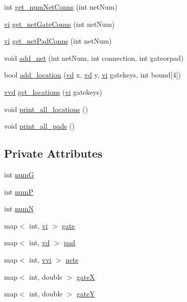 \begin{DoxyCompactItemize}
\item 
int \hyperlink{classmothercore_a3011be859dee0013e29f79abf268aadc}{get\+\_\+num\+Net\+Conns} (int net\+Num)
\item 
\hyperlink{qplacer_8cpp_a2954e26aee7d16c4a58d5cfb5571ea7e}{vi} \hyperlink{classmothercore_a6f54e96436e2451aaad73a72a19586f4}{get\+\_\+net\+Gate\+Conns} (int net\+Num)
\item 
\hyperlink{qplacer_8cpp_a2954e26aee7d16c4a58d5cfb5571ea7e}{vi} \hyperlink{classmothercore_a2259dbb05fb9c58c0ae092d695780beb}{get\+\_\+net\+Pad\+Conns} (int net\+Num)
\item 
void \hyperlink{classmothercore_a43d5c569faafb37f221a8c40252f4bb0}{add\+\_\+net} (int net\+Num, int connection, int gateorpad)
\item 
bool \hyperlink{classmothercore_a850753340ba6043464b7a93d6bf58124}{add\+\_\+location} (\hyperlink{qplacer_8cpp_a2f3b3a0095b65103cd56cf292e85fb85}{vd} x, \hyperlink{qplacer_8cpp_a2f3b3a0095b65103cd56cf292e85fb85}{vd} y, \hyperlink{qplacer_8cpp_a2954e26aee7d16c4a58d5cfb5571ea7e}{vi} gatekeys, int bound\mbox{[}4\mbox{]})
\item 
\hyperlink{qplacer_8cpp_a81afaa7cd3e8a4f1f3ff6300860a04f0}{vvd} \hyperlink{classmothercore_a7fa5a52e1a1790cd926fad59214c86c3}{get\+\_\+locations} (\hyperlink{qplacer_8cpp_a2954e26aee7d16c4a58d5cfb5571ea7e}{vi} gatekeys)
\item 
void \hyperlink{classmothercore_a2b0d43404024b9e7cc1486197784464b}{print\+\_\+all\+\_\+locations} ()
\item 
void \hyperlink{classmothercore_a275771097e3bcdd9bb9ae0f81deec259}{print\+\_\+all\+\_\+pads} ()
\end{DoxyCompactItemize}
\subsection*{Private Attributes}
\begin{DoxyCompactItemize}
\item 
int \hyperlink{classmothercore_ae81a713046775c9beb1e865f54238d58}{numG}
\item 
int \hyperlink{classmothercore_a2267ccb4d62638cb401e86b612a7b88a}{numP}
\item 
int \hyperlink{classmothercore_a06dd4fcec53dffd503474103e59fd2ed}{numN}
\item 
map$<$ int, \hyperlink{qplacer_8cpp_a2954e26aee7d16c4a58d5cfb5571ea7e}{vi} $>$ \hyperlink{classmothercore_a6d876a7f308f91dedcfeffab73b6d7e1}{gate}
\item 
map$<$ int, \hyperlink{qplacer_8cpp_a2f3b3a0095b65103cd56cf292e85fb85}{vd} $>$ \hyperlink{classmothercore_aa99289e91a4a78b1edc271498a68f88b}{pad}
\item 
map$<$ int, \hyperlink{qplacer_8cpp_accbf8abb54b0735d3ff50f4df4f45cb2}{vvi} $>$ \hyperlink{classmothercore_a38b10c51ec32bf1583bcfcca022a378b}{nets}
\item 
map$<$ int, double $>$ \hyperlink{classmothercore_ac267207dbf960e3f837769edee99d024}{gateX}
\item 
map$<$ int, double $>$ \hyperlink{classmothercore_a9d61c6914daf39e900b2f1c729be4ed3}{gateY}
\end{DoxyCompactItemize}


